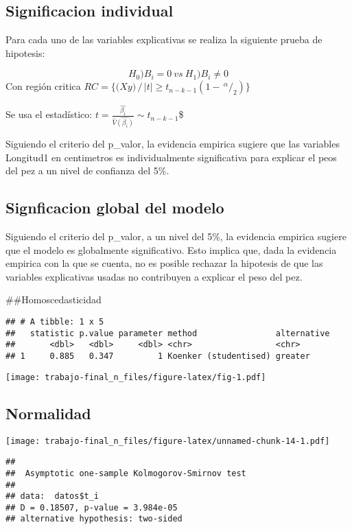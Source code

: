 \documentclass[
]{article}
\begin{document}
\subsection{Significacion individual}\label{significacion-individual}

Para cada uno de las variables explicativas se realiza la siguiente
prueba de hipotesis:

\[H_0) B_{i} = 0\ vs\ H_1) B_{i} \neq 0\] Con región critica
\(RC = \Big\{ \Big({X}{y}\Big) \, \Big/ \, |t| \geq t_{n-k-1} (1 - \, ^\alpha\!/_2) \Big\}\)

Se usa el estadístico:
\(t=\frac{\hat{\beta_i}}{\hat{V}\hat{(\beta_i)}}  \sim t_{n-k-1}\)\$

Siguiendo el criterio del p\_valor, la evidencia empirica sugiere que
las variables Longitud1 en centimetros es individualmente significativa
para explicar el peos del pez a un nivel de confianza del 5\%.

\subsection{Signficacion global del
modelo}\label{signficacion-global-del-modelo}

Siguiendo el criterio del p\_valor, a un nivel del 5\%, la evidencia
empirica sugiere que el modelo es globalmente significativo. Esto
implica que, dada la evidencia empirica con la que se cuenta, no es
posible rechazar la hipotesis de que las variables explicativas usadas
no contribuyen a explicar el peso del pez.

\#\#Homoscedasticidad

\begin{verbatim}
## # A tibble: 1 x 5
##   statistic p.value parameter method                alternative
##       <dbl>   <dbl>     <dbl> <chr>                 <chr>      
## 1     0.885   0.347         1 Koenker (studentised) greater
\end{verbatim}

\texttt{[image: trabajo-final\_n\_files/figure-latex/fig-1.pdf]}

\subsection{Normalidad}\label{normalidad-2}

\texttt{[image: trabajo-final\_n\_files/figure-latex/unnamed-chunk-14-1.pdf]}

\begin{verbatim}
## 
##  Asymptotic one-sample Kolmogorov-Smirnov test
## 
## data:  datos$t_i
## D = 0.18507, p-value = 3.984e-05
## alternative hypothesis: two-sided
\end{verbatim}
\end{document}
